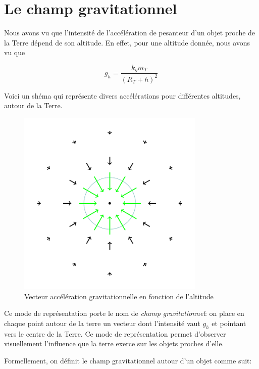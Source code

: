 \documentclass[
  letterpaper,
  DIV=11,
  numbers=noendperiod]{scrartcl}
\theoremstyle{definition}
\theoremstyle{definition}
\theoremstyle{definition}
\theoremstyle{remark}
\begin{document}
\section{Le champ gravitationnel}\label{le-champ-gravitationnel}

Nous avons vu que l'intensité de l'accélération de pesanteur d'un objet
proche de la Terre dépend de son altitude. En effet, pour une altitude
donnée, nous avons vu que

\[
g_h = \frac{k_g m_T}{(R_T + h)^2}
\]

Voici un shéma qui représente divers accélérations pour différentes
altitudes, autour de la Terre.

\begin{figure}[H]

{\centering \includegraphics[width=0.8\textwidth,height=\textheight]{figures/grav/fig6.pdf}

}

\caption{Vecteur accélération gravitationnelle en fonction de
l'altitude}

\end{figure}%

Ce mode de représentation porte le nom de \emph{champ gravitationnel}:
on place en chaque point autour de la terre un vecteur dont l'intensité
vaut \(g_h\) et pointant vers le centre de la Terre. Ce mode de
représentation permet d'observer visuellement l'influence que la terre
exerce sur les objets proches d'elle.

Formellement, on définit le champ gravitationnel autour d'un objet comme
suit:
\end{document}
